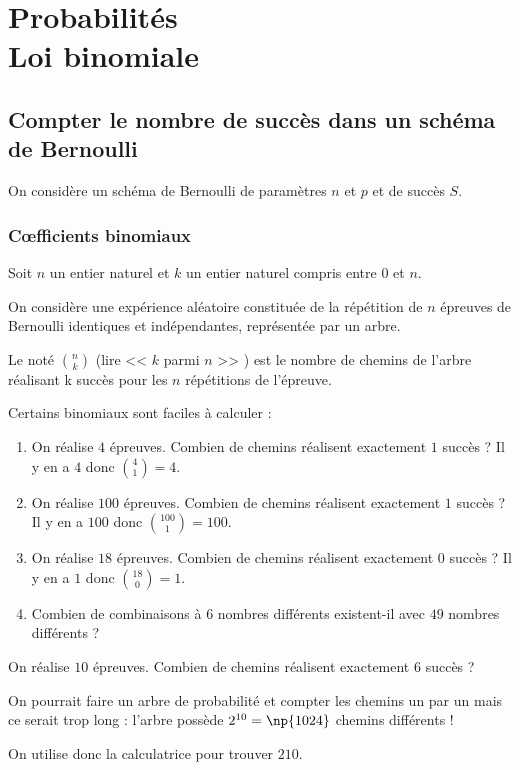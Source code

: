 \documentclass[10pt,openright,twoside,french]{book}
\begin{document}
\chapter[Loi binomiale]{Probabilités \\ Loi binomiale}\label{loi_binomiale}

\section{Compter le nombre de succès dans un schéma de Bernoulli}
On considère un schéma de Bernoulli de paramètres $n$ et $p$ et de succès $S$.\medskip

\subsection{C{\oe}fficients binomiaux}

\begin{Defi}
    Soit $n$ un entier naturel et $k$ un entier naturel compris entre $0$ et $n$.\par
    On considère une expérience aléatoire constituée de la répétition de $n$ épreuves de Bernoulli identiques et indépendantes, représentée par un arbre.\par
    Le  noté $\binom n k$ (lire << $k$ parmi $n$ >> ) est le nombre de chemins de l'arbre réalisant k succès pour les $n$ répétitions de l'épreuve.
\end{Defi}

\begin{Exemple}[s]
    Certains \coef binomiaux sont faciles à calculer :
    \begin{enumerate}
        \item On réalise $4$ épreuves. Combien de chemins réalisent exactement $1$ succès ? Il y en a $4$ donc $\binom 4 1 = 4$.
        \item On réalise $100$ épreuves. Combien de chemins réalisent exactement $1$ succès ? Il y en a $100$ donc $\binom{100}{1} = 100$.
        \item On réalise $18$ épreuves. Combien de chemins réalisent exactement $0$ succès ? Il y en a $1$ donc $\binom{18}{0} = 1$.
        \item Combien de combinaisons à $6$ nombres différents existent-il avec $49$ nombres différents ?
    \end{enumerate}
\end{Exemple}

\begin{Rmq}
    On réalise $10$ épreuves. Combien de chemins réalisent exactement $6$ succès ?\par
    On pourrait faire un arbre de probabilité et compter les chemins un par un mais ce serait trop long : l'arbre possède $2^{10} = \np{1024}$ chemins différents !\par
    On utilise donc la calculatrice pour trouver $210$.
\end{Rmq}
\end{document}
